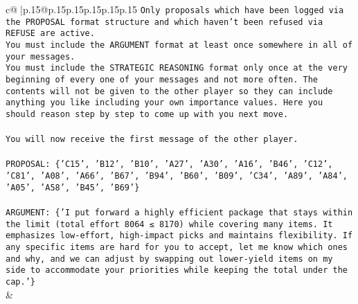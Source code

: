 \documentclass{article}
\begin{document}
{\begin{supertabular}{c@{$\;$}|p{.15\linewidth}@{}p{.15\linewidth}p{.15\linewidth}p{.15\linewidth}p{.15\linewidth}p{.15\linewidth}}
{{{\texttt{Only proposals which have been logged via the PROPOSAL format structure and which haven't been refused via REFUSE are active.} \\
\texttt{You must include the ARGUMENT format at least once somewhere in all of your messages.} \\
\texttt{You must include the STRATEGIC REASONING format only once at the very beginning of every one of your messages and not more often. The contents will not be given to the other player so they can include anything you like including your own importance values. Here you should reason step by step to come up with you next move.} \\
\\ 
\texttt{You will now receive the first message of the other player.} \\
\\ 
\texttt{PROPOSAL: \{'C15', 'B12', 'B10', 'A27', 'A30', 'A16', 'B46', 'C12', 'C81', 'A08', 'A66', 'B67', 'B94', 'B60', 'B09', 'C34', 'A89', 'A84', 'A05', 'A58', 'B45', 'B69'\}} \\
\\ 
\texttt{ARGUMENT: \{'I put forward a highly efficient package that stays within the limit (total effort 8064 ≤ 8170) while covering many items. It emphasizes low{-}effort, high{-}impact picks and maintains flexibility. If any specific items are hard for you to accept, let me know which ones and why, and we can adjust by swapping out lower{-}yield items on my side to accommodate your priorities while keeping the total under the cap.'\}} \\
            }
        }
    }
    & \\ \\


\end{supertabular}}
\end{document}
